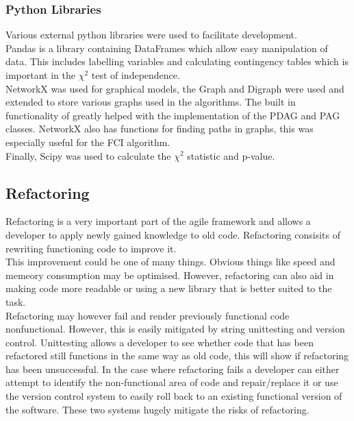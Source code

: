 \documentclass{article}
\begin{document}
\subsubsection{Python Libraries}
Various external python libraries were used to facilitate development.\\

Pandas is a library containing DataFrames which allow easy manipulation of data. This includes labelling variables and calculating contingency tables which is important in the $\chi^2$ test of independence.\\

NetworkX was used for graphical models, the Graph and Digraph were used and extended to store various graphs used in the algorithms. The built in functionality of greatly helped with the implementation of the PDAG and PAG classes. NetworkX also has functions for finding paths in graphs, this was especially useful for the FCI algorithm.\\

Finally, Scipy was used to calculate the $\chi^2$ statistic and p-value. \\

\subsection{Refactoring}
Refactoring is a very important part of the agile framework and allows a developer to apply newly gained knowledge to old code. Refactoring consisits of rewriting functioning code to improve it.\\

This improvement could be one of many things. Obvious things like speed and memeory consumption may be optimised. However, refactoring can also aid in making code more readable or using a new library that is better suited to the task.\\

Refactoring may however fail and render previously functional code nonfunctional. However, this is easily mitigated by string unittesting and version control. Unittesting allows a developer to see whether code that has been refactored still functions in the same way as old code, this will show if refactoring has been unsuccessful. In the case where refactoring fails a developer can either attempt to identify the non-functional area of code and repair/replace it or use the version control system to easily roll back to an existing functional version of the software. These two systems hugely mitigate the risks of refactoring.\\
\end{document}
